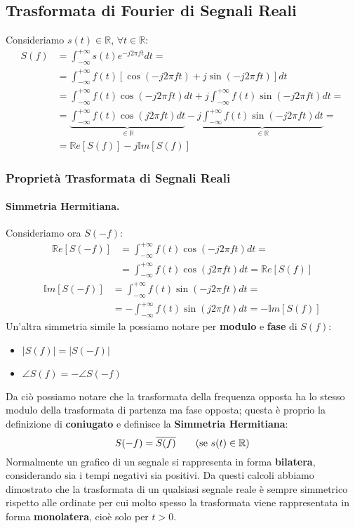 \subsection{Trasformata di Fourier di Segnali Reali}
Consideriamo $s(t) \in \mathbb{R}$, $\forall t \in \mathbb{R}$:
\begin{align*}
    S(f) &= \int_{-\infty}^{+\infty} s(t) e^{-j2 \pi f t} dt=\\
         &= \int_{-\infty}^{+\infty} f(t) \left[\cos(-j2 \pi f t) + j \sin(-j2 \pi f t)\right] dt\\
         &= \int_{-\infty}^{+\infty} f(t)\cos(-j2 \pi f t)dt + j \int_{-\infty}^{+\infty} f(t)\sin(-j2 \pi f t)dt =\\
         &= \underbrace{\int_{-\infty}^{+\infty} f(t)\cos(j2 \pi f t)dt}_{\in \mathbb{R}} - j \underbrace{\int_{-\infty}^{+\infty} f(t)\sin(-j2 \pi f t)dt}_{\in \mathbb{R}} =\\ \tag{per simmetrie}
         &= \mathbb{R}e\left[S(f)\right] -j\mathbb{I}m\left[S(f)\right] 
\end{align*}
\subsubsection{Proprietà Trasformata di Segnali Reali}
\paragraph{Simmetria Hermitiana.} Consideriamo ora $S(-f)$:
    \begin{align*}
        \mathbb{R}e[S(-f)] &= \int_{-\infty}^{+\infty} f(t)\cos(-j2 \pi f t)dt =\\
                           &= \int_{-\infty}^{+\infty} f(t)\cos(j2 \pi f t)dt = \mathbb{R}e[S(f)] \tag{simmetria pari}
    \end{align*}
    \begin{align*}
        \mathbb{I}m[S(-f)] &= \int_{-\infty}^{+\infty} f(t)\sin(-j2 \pi f t)dt =\\
                           &= -\int_{-\infty}^{+\infty} f(t)\sin(j2 \pi f t)dt = -\mathbb{I}m[S(f)] \tag{simmetria dispari}
    \end{align*}
Un'altra simmetria simile la possiamo notare per \textbf{modulo} e \textbf{fase} di $S(f)$:
\begin{itemize}
    \item $|S(f)| = |S(-f)|$
    \item $\angle S(f) = -\angle S(-f)$
\end{itemize}
Da ciò possiamo notare che la trasformata della frequenza opposta ha lo stesso modulo della trasformata di partenza ma fase opposta;
questa è proprio la definizione di \textbf{coniugato} e definisce la \textbf{Simmetria Hermitiana}:
\begin{equation}
    S(-f) = \overline{S(f)} \tag{se $s(t) \in \mathbb{R}$}
\end{equation}
Normalmente un grafico di un segnale si rappresenta in forma \textbf{bilatera}, considerando sia i tempi negativi sia positivi.
Da questi calcoli abbiamo dimostrato che la trasformata di un qualsiasi segnale reale è sempre simmetrico rispetto alle ordinate
per cui molto spesso la trasformata viene rappresentata in forma \textbf{monolatera}, cioè solo per $t > 0$.
